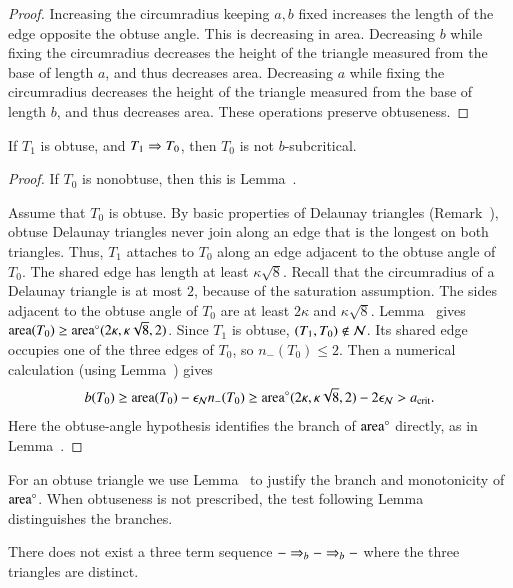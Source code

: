 \begin{proof}
  Increasing the circumradius keeping $a,b$ fixed increases the length of
  the edge opposite the obtuse angle.  This is decreasing in area.
  Decreasing $b$ while fixing the circumradius
  decreases the height of the triangle measured from the base of length $a$,
  and thus decreases area.
  Decreasing $a$ while fixing the circumradius
  decreases the height of the triangle measured from the base of length $b$,
  and thus decreases area.
  These operations preserve obtuseness.
\end{proof}

\begin{lemma}
  If $T_1$ is obtuse, and $T_1 \Rightarrow T_0$, then $T_0$ is not
  $b$-subcritical.
\end{lemma}

\begin{proof}  
  If $T_0$ is nonobtuse, then this is Lemma~.

  Assume that $T_0$ is obtuse.  By basic properties of Delaunay
  triangles (Remark~), obtuse Delaunay triangles never join
  along an edge that is the longest on both triangles.  Thus, $T_1$
  attaches to $T_0$ along an edge adjacent to the obtuse angle of
  $T_0$.  The shared edge has length at least $\kappa\sqrt8$.  
  Recall that the circumradius of a Delaunay triangle is at most $2$,
  because of the saturation assumption.  The sides adjacent to the
  obtuse angle of $T_0$ are at least $2\kappa$ and
  $\kappa\sqrt8$.  Lemma~ gives
  ${\operatorname{area}}(T_0)\ge{\operatorname{area}}^\circ(2\kappa,\kappa\sqrt8,2)$.
  Since $T_1$ is obtuse, $(T_1,T_0)\notin\mathcal N$.  Its shared edge
  occupies one of the three edges of $T_0$, so $n_-(T_0)\le2$.  Then a numerical calculation (using %
  Lemma~) gives
\[
b(T_0) \ge {\operatorname{area}}(T_0) - \epsilon_{\mathcal N} n_-(T_0) \ge 
{\operatorname{area}}^\circ(2\kappa,\kappa\sqrt{8},2) - 2\epsilon_{\mathcal N} > a_\text{crit}.
\] 
Here the obtuse-angle hypothesis identifies the branch of ${\operatorname{area}}^\circ$
directly, as in Lemma~.
\end{proof}

For an obtuse triangle we use Lemma~
to justify the branch and monotonicity of ${\operatorname{area}}^\circ$.  When obtuseness
is not prescribed, the test following Lemma~
distinguishes the branches.

\begin{lemma}  There does not exist a three
  term sequence $- \Rightarrow_{b} -\Rightarrow_{b} -$ where the three triangles are
  distinct.
\end{lemma}

